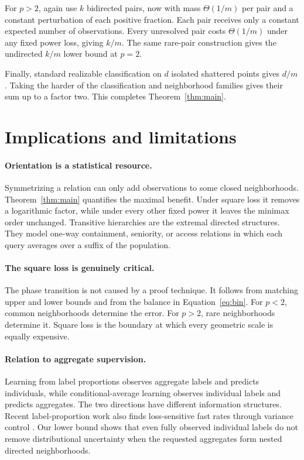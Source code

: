 \documentclass{article}
\theoremstyle{definition}
\theoremstyle{remark}
\begin{document}
For $p>2$, again use $k$ bidirected pairs, now with mass $\Theta(1/m)$ per pair and a constant perturbation of each positive fraction. Each pair receives only a constant expected number of observations. Every unresolved pair costs $\Theta(1/m)$ under any fixed power loss, giving $k/m$. The same rare-pair construction gives the undirected $k/m$ lower bound at $p=2$.

Finally, standard realizable classification on $d$ isolated shattered points gives $d/m$. Taking the harder of the classification and neighborhood families gives their sum up to a factor two. This completes Theorem~\ref{thm:main}.

\section{Implications and limitations}
\label{sec:discussion}

\paragraph{Orientation is a statistical resource.} Symmetrizing a relation can only add observations to some closed neighborhoods. Theorem~\ref{thm:main} quantifies the maximal benefit. Under square loss it removes a logarithmic factor, while under every other fixed power it leaves the minimax order unchanged. Transitive hierarchies are the extremal directed structures. They model one-way containment, seniority, or access relations in which each query averages over a suffix of the population.

\paragraph{The square loss is genuinely critical.} The phase transition is not caused by a proof technique. It follows from matching upper and lower bounds and from the balance in Equation~\eqref{eq:bin}. For $p<2$, common neighborhoods determine the error. For $p>2$, rare neighborhoods determine it. Square loss is the boundary at which every geometric scale is equally expensive.

\paragraph{Relation to aggregate supervision.} Learning from label proportions observes aggregate labels and predicts individuals, while conditional-average learning observes individual labels and predicts aggregates. The two directions have different information structures. Recent label-proportion work also finds loss-sensitive fast rates through variance control \citep{busa2025proportions}. Our lower bound shows that even fully observed individual labels do not remove distributional uncertainty when the requested aggregates form nested directed neighborhoods.
\end{document}
